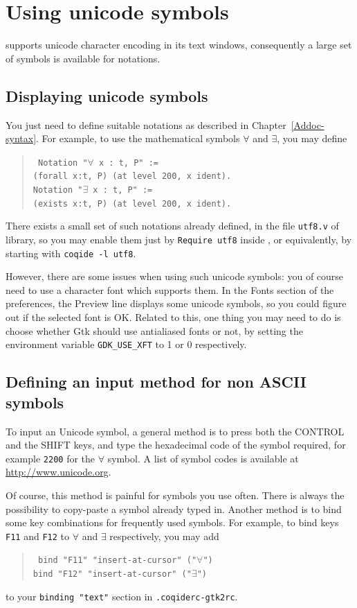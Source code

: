 \section{Using unicode symbols}

\CoqIDE{} supports unicode character encoding in its text windows,
consequently a large set of symbols is available for notations.

\subsection{Displaying unicode symbols}

You just need to define suitable notations as described in
Chapter~\ref{Addoc-syntax}. For example, to use the mathematical symbols
$\forall$ and $\exists$, you may define 
\begin{quote}\tt
Notation "$\forall$ x : t, P" := \\
\qquad  (forall x:t, P) (at level 200, x ident).\\
Notation "$\exists$ x : t, P" := \\
\qquad  (exists x:t, P) (at level 200, x ident).
\end{quote}
There exists a small set of such notations already defined, in the
file \verb|utf8.v| of \Coq{} library, so you may enable them just by 
\verb|Require utf8| inside \CoqIDE{}, or equivalently, by starting
\CoqIDE{} with \verb|coqide -l utf8|.

However, there are some issues when using such unicode symbols: you of
course need to use a character font which supports them. In the Fonts
section of the preferences, the Preview line displays some unicode symbols, so
you could figure out if the selected font is OK. Related to this, one
thing you may need to do is choose whether Gtk should use antialiased
fonts or not, by setting the environment variable \verb|GDK_USE_XFT|
to 1 or 0 respectively.

\subsection{Defining an input method for non ASCII symbols}

To input an Unicode symbol, a general method is to press both the
CONTROL and the SHIFT keys, and type the hexadecimal code of the
symbol required, for example \verb|2200| for the $\forall$ symbol.
A list of symbol codes is available at \url{http://www.unicode.org}. 

Of course, this method is painful for symbols you use often. There is
always the possibility to copy-paste a symbol already typed in.
Another method is to bind some key combinations for frequently used
symbols. For example, to bind keys \verb|F11| and \verb|F12| to
$\forall$ and $\exists$ respectively, you may add
\begin{quote}\tt
  bind "F11" {"insert-at-cursor" ("$\forall$")}\\
  bind "F12" {"insert-at-cursor" ("$\exists$")}
\end{quote}
to your \verb|binding "text"| section in \verb|.coqiderc-gtk2rc|.


